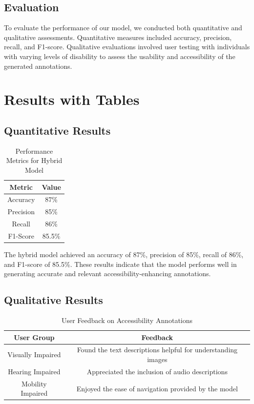 \subsection{Evaluation}
To evaluate the performance of our model, we conducted both quantitative and qualitative assessments. Quantitative measures included accuracy, precision, recall, and F1-score. Qualitative evaluations involved user testing with individuals with varying levels of disability to assess the usability and accessibility of the generated annotations.

\section{Results with Tables}
\subsection{Quantitative Results}
\begin{table}[ht]
\centering
\caption{Performance Metrics for Hybrid Model}
\begin{tabular}{|c|c|}
\hline
\textbf{Metric} & \textbf{Value} \\
\hline
Accuracy & 87\% \\
Precision & 85\% \\
Recall & 86\% \\
F1-Score & 85.5\% \\
\hline
\end{tabular}
\label{tab:results}
\end{table}

The hybrid model achieved an accuracy of 87\%, precision of 85\%, recall of 86\%, and F1-score of 85.5\%. These results indicate that the model performs well in generating accurate and relevant accessibility-enhancing annotations.

\subsection{Qualitative Results}
\begin{table}[ht]
\centering
\caption{User Feedback on Accessibility Annotations}
\begin{tabular}{|c|c|}
\hline
\textbf{User Group} & \textbf{Feedback} \\
\hline
Visually Impaired & Found the text descriptions helpful for understanding images \\
Hearing Impaired & Appreciated the inclusion of audio descriptions \\
Mobility Impaired & Enjoyed the ease of navigation provided by the model \\
\hline
\end{tabular}
\label{tab:user-feedback}
\end{table}

